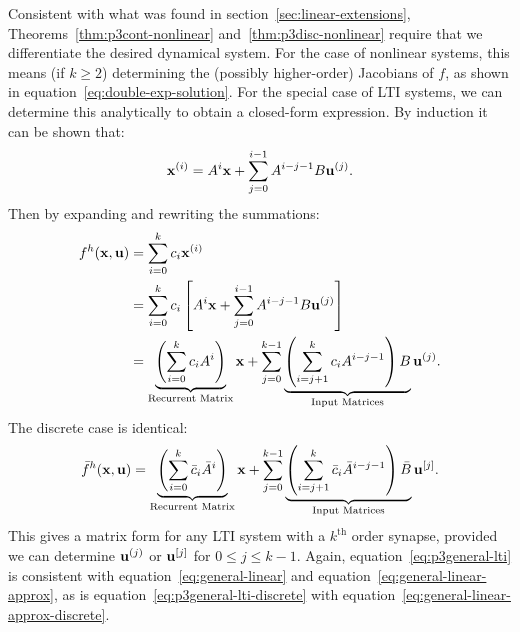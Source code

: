 Consistent with what was found in section~\ref{sec:linear-extensions}, Theorems~\ref{thm:p3cont-nonlinear} and~\ref{thm:p3disc-nonlinear} require that we differentiate the desired dynamical system.
For the case of nonlinear systems, this means (if $k \ge 2$) determining the (possibly higher-order) Jacobians of $f$, as shown in equation~\ref{eq:double-exp-solution}.
For the special case of LTI systems, we can determine this analytically to obtain a closed-form expression.
By induction it can be shown that:
$$\mathbf{x}^{(i)} = A^i\mathbf{x} + \sum_{j=0}^{i-1} A^{i-j-1} B \mathbf{u}^{(j)} \text{.}$$
Then by expanding and rewriting the summations:
\begin{align}
f^h(\mathbf{x}, \mathbf{u}) &= \sum_{i=0}^k c_i \mathbf{x}^{(i)} \nonumber \\
&= \sum_{i=0}^k c_i \left[ A^i \mathbf{x} + \sum_{j=0}^{i-1} A^{i-j-1} B \mathbf{u}^{(j)} \right] \nonumber \\
&= \underbrace{\left( \sum_{i=0}^k c_i A^i \right)}_{\text{Recurrent
Matrix}}\mathbf{x} + \sum_{j=0}^{k-1} \underbrace{\left( \sum_{i=j+1}^k c_i A^{i-j-1} \right)B}_{\text{Input Matrices}} \mathbf{u}^{(j)} \text{.} \label{eq:p3general-lti}
\end{align}
The discrete case is identical:
\begin{align}
\bar{f}^h(\mathbf{x}, \mathbf{u}) = \underbrace{\left( \sum_{i=0}^k \bar{c}_i \bar{A}^i \right)}_{\text{Recurrent
Matrix}}\mathbf{x} + \sum_{j=0}^{k-1} \underbrace{\left( \sum_{i=j+1}^k \bar{c}_i \bar{A}^{i-j-1} \right)\bar{B}}_{\text{Input Matrices}} \mathbf{u}^{[j]} \text{.} \label{eq:p3general-lti-discrete}
\end{align}
This gives a matrix form for any LTI system with a $k^\text{th}$ order synapse, provided we can determine $\mathbf{u}^{(j)}$ or $\mathbf{u}^{[j]}$ for $0 \le j \le k-1$.
Again, equation~\ref{eq:p3general-lti} is consistent with equation~\ref{eq:general-linear} and equation~\ref{eq:general-linear-approx}, as is equation~\ref{eq:p3general-lti-discrete} with equation~\ref{eq:general-linear-approx-discrete}.

